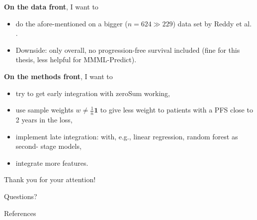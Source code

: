 \documentclass[10pt, aspectratio=169]{beamer}
\begin{document}
\begin{frame}{}
  \textbf{On the data front}, I want to  
  \begin{itemize}
    \item do the afore-mentioned on a \alert{bigger ($n = 624 \gg 229$) data set} by Reddy 
      et al. \autocite{reddy17}. 
    \item Downside: only overall, no progression-free survival included (fine 
      for this thesis, less helpful for MMML-Predict).
  \end{itemize}

  \pause
  \textbf{On the methods front}, I want to 
  \begin{itemize}
    \item try to get \alert{early integration} with zeroSum working,
    \item use sample weights $w \neq \frac{1}{n} \mathbf{1}$ to give less weight to patients with 
      a PFS close to 2 years in the loss,
    \item implement \alert{late integration}: with, e.g., linear regression, random forest as second-
      stage models,
    \item integrate more features.
  \end{itemize}
\end{frame}

\begin{frame}[standout]
  Thank you for your attention! \par Questions?
\end{frame}

\appendix

\begin{frame}[allowframebreaks]{References}
  \printbibliography
\end{frame}
\end{document}
